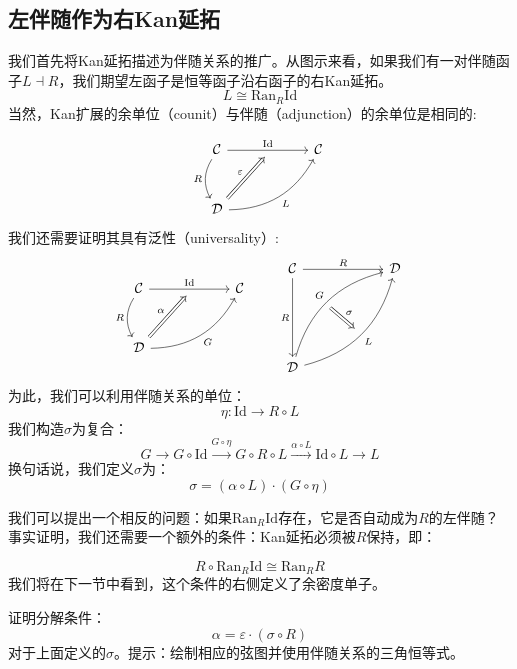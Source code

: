 \documentclass[DaoFP]{subfiles}
\begin{document}
\subsection{左伴随作为右Kan延拓}

我们首先将Kan延拓描述为伴随关系的推广。从图示来看，如果我们有一对伴随函子$L \dashv R$，我们期望左函子是恒等函子沿右函子的右Kan延拓。
\[ L \cong \text{Ran}_R \text{Id} \]
当然，Kan扩展的余单位（counit）与伴随（adjunction）的余单位是相同的:

 \[
 \begin{tikzcd} [row sep=1cm, column sep=1cm]
 \cat C
 \arrow[rr, "\text{Id}", "" {name=ID, below} ]
 \arrow[d, bend right, "R"']
 && \cat C
 \\
 \cat D
  \arrow[urr, bend right, "L"']
 \arrow[Rightarrow, "\varepsilon",  to=ID]
 \end{tikzcd}
\]
我们还需要证明其具有泛性（universality）:
\[
 \begin{tikzcd} [row sep=1cm, column sep=1cm]
 \cat C
 \arrow[rr, "\text{\text{Id}}", "" {name=ID, below} ]
 \arrow[d, bend right, "R"']
 && \cat C
 \\
 \cat D
  \arrow[urr, bend right, "G"']
 \arrow[Rightarrow, "\alpha",  to=ID]
 \end{tikzcd}
 \qquad %
\begin{tikzcd}[row sep=2cm, column sep=2cm]
\cat C  \ar[d, "R"', "" {name=P}]
            \ar[r, "R", ""  {name=F, below, near start, bend right}]
&
\cat D
\\
\cat D
    \ar[ur, bend left, "G", "" {name=G, below}]
    \ar[ur, bend right, "L"', "" {name=Ran}]
\arrow[Rightarrow, "\sigma", from=G, to=Ran]
\end{tikzcd}
\]
为此，我们可以利用伴随关系的单位：
\[ \eta \colon \text{Id} \to R \circ L \]
我们构造$\sigma$为复合：
\[ G \rightarrow G \circ \text{Id} \xrightarrow{G \circ \eta} G \circ R \circ L \xrightarrow{\alpha \circ L} \text{Id} \circ L \rightarrow L\]
换句话说，我们定义$\sigma$为：
\[ \sigma = (\alpha \circ L) \cdot (G \circ \eta) \]

我们可以提出一个相反的问题：如果$\text{Ran}_R \text{Id}$存在，它是否自动成为$R$的左伴随？事实证明，我们还需要一个额外的条件：Kan延拓必须被$R$保持，即：

\[ R \circ \text{Ran}_R \text{Id} \cong \text{Ran}_R R \]
我们将在下一节中看到，这个条件的右侧定义了余密度单子。

\begin{exercise}
证明分解条件：
\[ \alpha = \varepsilon \cdot (\sigma \circ R) \]
对于上面定义的$\sigma$。提示：绘制相应的弦图并使用伴随关系的三角恒等式。
\end{exercise}
\end{document}
